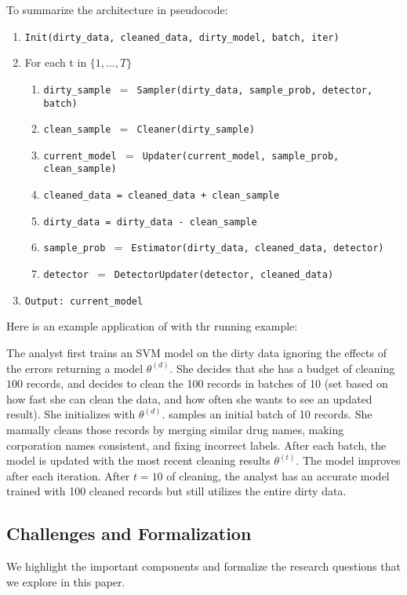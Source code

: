 To summarize the architecture in pseudocode:
\begin{enumerate}[leftmargin=1em]\scriptsize\sloppy
\item \texttt{Init(dirty\_data, cleaned\_data, dirty\_model, batch, iter)}
\item For each t in $\{1,...,T\}$
\begin{enumerate}
	\item \texttt{dirty\_sample $=$ Sampler(dirty\_data, sample\_prob, detector, batch)}
	\item \texttt{clean\_sample $=$ Cleaner(dirty\_sample)}
	\item \texttt{current\_model $=$ Updater(current\_model, sample\_prob, clean\_sample)}
	\item \texttt{cleaned\_data = cleaned\_data + clean\_sample}
	\item \texttt{dirty\_data = dirty\_data - clean\_sample}
	\item \texttt{sample\_prob $=$ Estimator(dirty\_data, cleaned\_data, detector)}
	\item \texttt{detector $=$ DetectorUpdater(detector, cleaned\_data)}
\end{enumerate}
\item \texttt{Output: current\_model}
\end{enumerate}

Here is an example application of \sys with thr running example:
\begin{example}
The analyst first trains an SVM model on the dirty data ignoring the effects of the errors returning a model $\theta^{(d)}$.
She decides that she has a budget of cleaning $100$ records, and decides to clean the 100 records in batches of 10 (set based on how fast she can clean the data, and how often she wants to see an updated result).
She initializes \sys with $\theta^{(d)}$.
\sys samples an initial batch of 10 records.
She manually cleans those records by merging similar drug names, making corporation names consistent, and fixing incorrect labels.
After each batch, the model is updated with the most recent cleaning results $\theta^{(t)}$.
The model improves after each iteration.
After $t=10$ of cleaning, the analyst has an accurate model trained with 100 cleaned records but still utilizes the entire dirty data.
\end{example}

\subsection{Challenges and Formalization}
We highlight the important components and formalize the research questions that we explore in this paper. 

